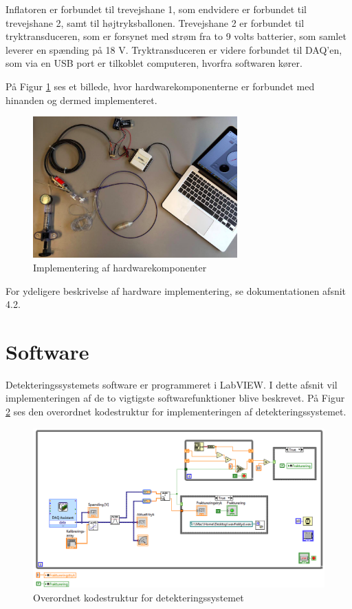 Inflatoren er forbundet til trevejshane 1, som endvidere er forbundet til trevejshane 2, samt til højtryksballonen. Trevejshane 2 er forbundet til tryktransduceren, som er forsynet med strøm fra to 9 volts batterier, som samlet leverer en spænding på 18 V. Tryktransduceren er videre forbundet til DAQ'en, som via en USB port er tilkoblet computeren, hvorfra softwaren kører. 

På Figur \ref{Implementering2} ses et billede, hvor hardwarekomponenterne er forbundet med hinanden og dermed implementeret. 

\begin{figure}[H]
	\centering
	\includegraphics[width=0.7\textwidth]{Figure/Implementering}
	\caption{Implementering af hardwarekomponenter}
    \label{Implementering2}
\end{figure}

For ydeligere beskrivelse af hardware implementering, se dokumentationen afsnit 4.2.     

\section{Software}
Detekteringssystemets software er programmeret i LabVIEW. I dette afsnit vil implementeringen af de to vigtigste softwarefunktioner blive beskrevet. På Figur \ref{SW_1} ses den overordnet kodestruktur for implementeringen af detekteringssystemet. 

\begin{figure}[H]
	\centering
	\includegraphics[width=1\textwidth]{Figure/SW_1}
	\caption{Overordnet kodestruktur for detekteringssystemet}
	\label{SW_1}
\end{figure} 

